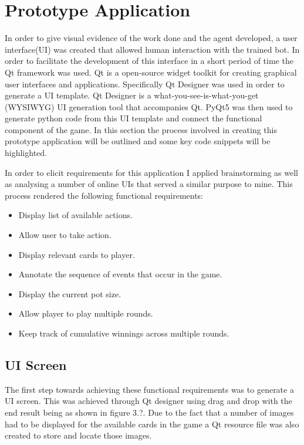\section{Prototype Application}\label{sec:prototypeApp}
In order to give visual evidence of the work done and the agent developed, a user interface(UI) was created
that allowed human interaction with the trained bot.
In order to facilitate the development of this interface in a short period of time the Qt framework was used.
Qt is a open-source widget toolkit for creating graphical user interfaces and applications.
Specifically Qt Designer was used in order to generate a UI template.
Qt Designer is a what-you-see-is-what-you-get (WYSIWYG) UI generation tool that accompanies Qt.
PyQt5 was then used to generate python code from this UI template and connect the functional component of the game.
In this section the process involved in creating this prototype application will be outlined
and some key code snippets will be highlighted.

In order to elicit requirements for this application I applied brainstorming as well as analysing a number
of online UIs that served a similar purpose to mine.
This process rendered the following functional requirements:
\begin{itemize}
    \item Display list of available actions.
    \item Allow user to take action.
    \item Display relevant cards to player.
    \item Annotate the sequence of events that occur in the game.
    \item Display the current pot size.
    \item Allow player to play multiple rounds.
    \item Keep track of cumulative winnings across multiple rounds.
\end{itemize}

\subsection{UI Screen}\label{subsec:UiScreen}
The first step towards achieving these functional requirements was to generate a UI screen.
This was achieved through Qt designer using drag and drop with the end result being as shown in figure 3.?.
Due to the fact that a number of images had to be displayed for the available cards in the
game a Qt resource file was also created to store and locate those images.

